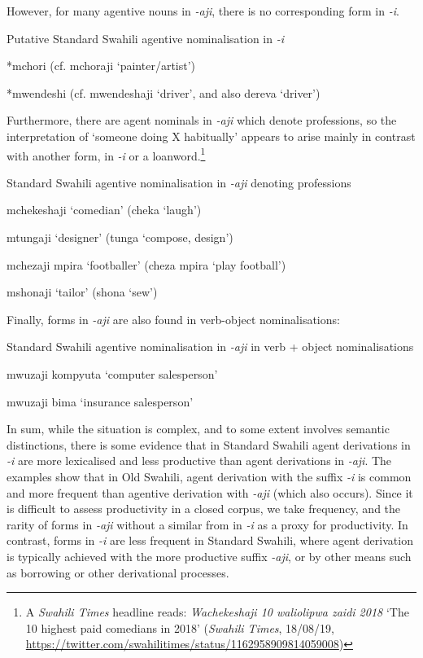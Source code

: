 \documentclass[output=paper]{langscibook}
\begin{document}
  However, for many agentive nouns in \textit{{}-aji}, there is no corresponding form in \textit{{}-i}.  

\ea\label{ex:marten:25}Putative Standard Swahili agentive nominalisation in \textit{{}-i} 

    \ea\label{ex:marten:25a}  *mchori        (cf. mchoraji ‘painter/artist’)

    \ex\label{ex:marten:25b}  *mwendeshi    (cf. mwendeshaji ‘driver’, and also dereva ‘driver’)
    \z
\z

Furthermore, there are agent nominals in \textit{{}-aji} which denote professions, so the interpretation of ‘someone doing X habitually’ appears to arise mainly in contrast with another form, in \textit{{}-i} or a loanword.\footnote{A \textit{Swahili Times} headline reads: \textit{Wachekeshaji 10 waliolipwa zaidi 2018} ‘The 10 highest paid comedians in 2018’ (\textit{Swahili Times}, 18/08/19, \url{https://twitter.com/swahilitimes/status/1162958909814059008})
} 

\ea\label{ex:marten:26}Standard Swahili agentive nominalisation in \textit{{}-aji} denoting professions 

    \ea\label{ex:marten:26a}  mchekeshaji ‘comedian’    (cheka ‘laugh’)

    \ex\label{ex:marten:26b}  mtungaji ‘designer’         (tunga ‘compose, design’)

    \ex\label{ex:marten:26c}  mchezaji mpira ‘footballer’  (cheza mpira ‘play football’)

    \ex\label{ex:marten:26d}  mshonaji ‘tailor’          (shona ‘sew’)
    \z
\z

Finally, forms in \textit{{}-aji} are also found in verb-object nominalisations:

\ea\label{ex:marten:27} Standard Swahili agentive nominalisation in \textit{{}-aji} in verb + object nominalisations

    \ea\label{ex:marten:27a}  mwuzaji kompyuta ‘computer salesperson’

    \ex\label{ex:marten:27b}  mwuzaji bima  ‘insurance salesperson’ 
    \z
\z

In sum, while the situation is complex, and to some extent involves semantic distinctions, there is some evidence that in Standard Swahili agent derivations in \textit{{}-i} are more lexicalised and less productive than agent derivations in \textit{{}-aji}. The examples show that in Old Swahili, agent derivation with the suffix \textit{{}-i} is common and more frequent than agentive derivation with \textit{{}-aji} (which also occurs). Since it is difficult to assess productivity in a closed corpus, we take frequency, and the rarity of forms in \textit{{}-aji} without a similar from in \textit{{}-i} as a proxy for productivity. In contrast, forms in \textit{{}-i} are less frequent in Standard Swahili, where agent derivation is typically achieved with the more productive suffix \textit{{}-aji}, or by other means such as borrowing or other derivational processes. 
\end{document}
